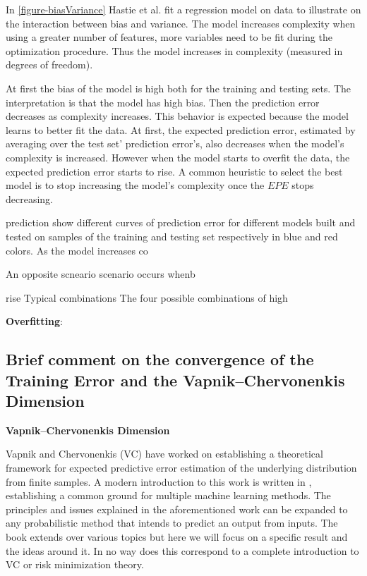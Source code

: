 In \ref{figure-biasVariance} Hastie et al. fit a regression model on data to illustrate on the interaction between bias and variance. The model increases complexity when using a greater number of features, more variables need to be fit during the optimization procedure. Thus the model increases in complexity (measured in degrees of freedom). 

At first the bias of the model is high both for the training and testing sets. The interpretation is that the model has high bias. Then the prediction error decreases as complexity increases. This behavior is expected because the model learns to better fit the data. At first, the expected prediction error, estimated by averaging over the test set' prediction error's, also decreases when the model's complexity is increased. However when the model starts to overfit the data, the expected prediction error starts to rise. A common heuristic to select the best model is to stop increasing the model's complexity once the $EPE$ stops decreasing.


prediction 
show different curves of prediction error for different models built and tested on samples of the training and testing set respectively in blue and red colors. As the model increases co

An opposite scneario scenario occurs whenb

rise Typical combinations
The four possible combinations of high 


\textbf{Overfitting}: 
 


\subsection{Brief comment on the convergence of the Training Error and the Vapnik–Chervonenkis Dimension}
\textbf{Vapnik–Chervonenkis Dimension}
\cite{vapnik-nature2013}
\cite{cherkassky-learning2007}

Vapnik and Chervonenkis (VC) have worked on establishing a theoretical framework for expected predictive error estimation of the underlying distribution from finite samples. A modern introduction to this work is written in \cite{cherkassky-learning2007}, establishing a common ground for multiple machine learning methods. The principles and issues explained in the aforementioned work can be expanded to any probabilistic method that intends to predict an output from inputs. The book extends over various topics but here we will focus on a specific result and the ideas around it. In no way does this correspond to a complete introduction to VC or risk minimization theory.

